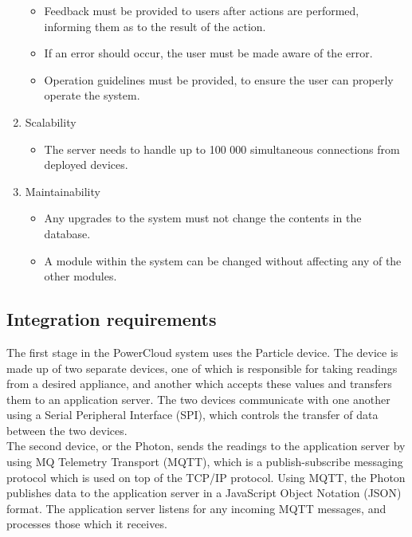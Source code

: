 \documentclass{article}
\begin{document}
\begin{enumerate}
\begin{itemize}
				\item Feedback must be provided to users after actions are performed, informing them as to the result of the action.
				\item If an error should occur, the user must be made aware of the error.
				\item Operation guidelines must be provided, to ensure the user can properly operate the system.
			\end{itemize}
		\item Scalability
			\begin{itemize}
				\item The server needs to handle up to 100 000 simultaneous connections from deployed devices.
			\end{itemize}
		\item Maintainability
			\begin{itemize}
				\item Any upgrades to the system must not change the contents in the database.
				\item A module within the system can be changed without affecting any of the other modules.
			\end{itemize}
	\end{enumerate}
	
	\newpage
	
	\subsection{Integration requirements}
	
	The first stage in the PowerCloud system uses the Particle device. The device is made up of two separate devices, one of which is responsible for taking readings from a desired appliance, and another which accepts these values and transfers them to an application server. The two devices communicate with one another using a Serial Peripheral Interface (SPI), which controls the transfer of data between the two devices.\\
	
	The second device, or the Photon, sends the readings to the application server by using MQ Telemetry Transport (MQTT), which is a publish-subscribe messaging protocol which is used on top of the TCP/IP protocol. Using MQTT, the Photon publishes data to the application server in a JavaScript Object Notation (JSON) format. The application server listens for any incoming MQTT messages, and processes those which it receives.\\
	
\end{document}
